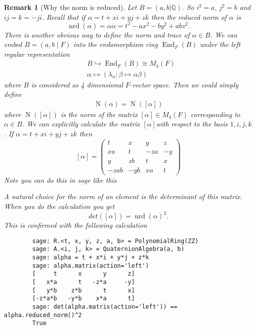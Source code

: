 \documentclass[10pt]{article}
\theoremstyle{plain}
\newtheorem{remark}[theorem]{Remark}
\theoremstyle{definition}
\newcommand{\iso}{\cong}
\newcommand{\op}{\operatorname}
\newcommand{\Q}{\mathbb{Q}}
\newcommand{\End}{\op{End}}
\newcommand{\nrd}{\op{nrd}}
\begin{document}
\begin{remark}[Why the norm is reduced]
    Let \( B = (a, b | \Q )\).
    So \( i^2 = a \), \( j^2 = b \) and \( ij = k = -ji \).
    Recall that if \( \alpha = t + xi + yj + zk \) then the reduced norm of \( \alpha \) is
    \[
        \nrd(\alpha) = \alpha \overline{\alpha} = t^2 - ax^2 - by^2 + abz^2.
    \]
    There is another obvious way to define the norm and trace of $\alpha \in B$.
    We can embed $B = (a, b \mid F)$ into the endomorphism ring $\End_F(B)$ under the left regular representation
    \begin{align*}
          & B \hookrightarrow \End_F(B) \iso M_4(F)                       \\
          & \alpha \mapsto (\lambda_{\alpha}: \beta \mapsto \alpha \beta)
    \end{align*}
    where $B$ is considered as 4 dimensional $F$-vector space.
    Then we could simply define
    \begin{align*}
        \op{N}(\alpha) = \op{N}([\alpha])
    \end{align*}
    where $\op{N}([\alpha])$ is the norm of the matrix $[\alpha]\in M_4(F) $ corresponding to $\alpha \in B$.
    We can explicitly calculate the matrix \( [\alpha] \)with respect to the basis \( 1, i, j, k \).
    If \( \alpha = t + xi + yj + zk \) then
    \[
        [\alpha] =
        \begin{pmatrix}
            t    & x   & y   & z  \\
            xa   & t   & -za & -y \\
            y    & zb  & t   & x  \\
            -zab & -yb & xa  & t
        \end{pmatrix}
    \]
    Note you can do this in sage like this

    A natural choice for the norm of an element is the determinant of this matrix.
    When you do the calculation you get
    \[
        det([\alpha]) = \nrd(\alpha)^2.
    \]
    This is confirmed with the following calculation
    \begin{lstlisting}
        sage: R.<t, x, y, z, a, b> = PolynomialRing(ZZ)
        sage: A.<i, j, k> = QuaternionAlgebra(a, b)
        sage: alpha = t + x*i + y*j + z*k
        sage: alpha.matrix(action='left')
        [     t      x      y      z]
        [   x*a      t   -z*a     -y]
        [   y*b    z*b      t      x]
        [-z*a*b   -y*b    x*a      t]
        sage: det(alpha.matrix(action='left')) == alpha.reduced_norm()^2
        True
    \end{lstlisting}


\end{remark}
\end{document}

